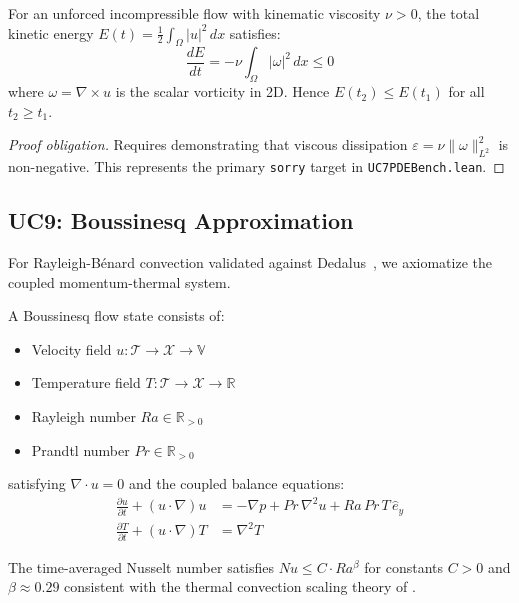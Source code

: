 \begin{theorem}
\label{thm:energy_decay}
For an unforced incompressible flow with kinematic viscosity $\nu > 0$, the total kinetic energy $E(t) = \frac{1}{2}\int_\Omega |u|^2\,dx$ satisfies:
\begin{equation}
  \frac{dE}{dt} = -\nu \int_\Omega |\omega|^2\,dx \leq 0
\end{equation}
where $\omega = \nabla \times u$ is the scalar vorticity in 2D. Hence $E(t_2) \leq E(t_1)$ for all $t_2 \ge t_1$.
\end{theorem}

\begin{proof}[Proof obligation]
Requires demonstrating that viscous dissipation $\varepsilon = \nu \|\omega\|_{L^2}^2$ is non-negative. This represents the primary \texttt{sorry} target in \texttt{UC7PDEBench.lean}.
\end{proof}

\subsection{UC9: Boussinesq Approximation}
\label{sec:boussinesq}

For Rayleigh-B\'enard convection validated against Dedalus~\citep{burns2020dedalus}, we axiomatize the coupled momentum-thermal system.

\begin{definition}
\label{def:boussinesq}
A Boussinesq flow state consists of:
\begin{itemize}
  \item Velocity field $u : \mathcal{T} \to \mathcal{X} \to \mathbb{V}$
  \item Temperature field $T : \mathcal{T} \to \mathcal{X} \to \mathbb{R}$
  \item Rayleigh number $Ra \in \mathbb{R}_{>0}$
  \item Prandtl number $Pr \in \mathbb{R}_{>0}$
\end{itemize}
satisfying $\nabla \cdot u = 0$ and the coupled balance equations:
\begin{align}
  \frac{\partial u}{\partial t} + (u \cdot \nabla)u &= -\nabla p + Pr\,\nabla^2 u + Ra\,Pr\,T\,\hat{e}_y \\
  \frac{\partial T}{\partial t} + (u \cdot \nabla)T &= \nabla^2 T
\end{align}
\end{definition}

\begin{theorem}
\label{thm:nusselt}
The time-averaged Nusselt number satisfies $Nu \leq C \cdot Ra^\beta$ for constants $C > 0$ and $\beta \approx 0.29$ consistent with the thermal convection scaling theory of \citet{grossmann2000scaling}.
\end{theorem}


